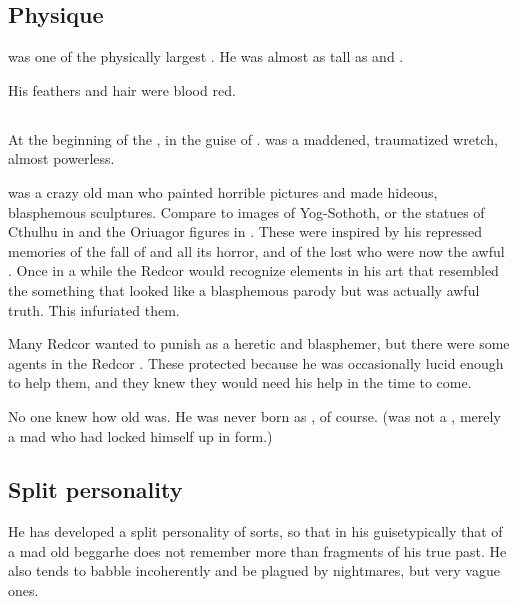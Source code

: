 \subsection{Physique}
\Sithiyacaan{} was one of the physically largest \satharioth. 
He was almost as tall as \Harbeth{} and \Zachirah. 

His feathers and hair were blood red.









\subsection{\MoriceHerette}
At the beginning of the \thirdbanewar, \Sithiyacaan {} in the guise of {\MoriceHerette}. 
\Sithiyacaan was a maddened, traumatized wretch, almost powerless. 

\Herette was a crazy old \human man who painted horrible pictures and made hideous, blasphemous sculptures. 
Compare to images of Yog-Sothoth, or the statues of Cthulhu in \cite{HPLovecraft:TheCallofCthulhu} and the Oriuagor figures in \cite{PalleVibe:OriuagorsProfeti}. 
These were inspired by his repressed memories of the fall of \Kezerad and all its horror, and of the lost \beacons who were now the awful \sephiroth.
Once in a while the Redcor would recognize elements in his art that resembled the \sephiroth\dash something that looked like a blasphemous parody but was actually awful truth. 
This infuriated them. 

Many Redcor wanted to punish \Herette as a heretic and blasphemer, but there were some \Kezeradi agents in the Redcor .
These protected \Herette because he was occasionally lucid enough to help them, and they knew they would need his help in the time to come. 

No one knew how old \Herette was. 
He was never born as \human, of course. 
(\Sithiyacaan was not a \malach, merely a mad \resphan who had locked himself up in \human form.)









\subsection{Split personality}
He has developed a split personality of sorts, so that in his guise\dash typically that of a mad old beggar\dash he does not remember more than fragments of his true past. He also tends to babble incoherently and be plagued by nightmares, but very vague ones. 

